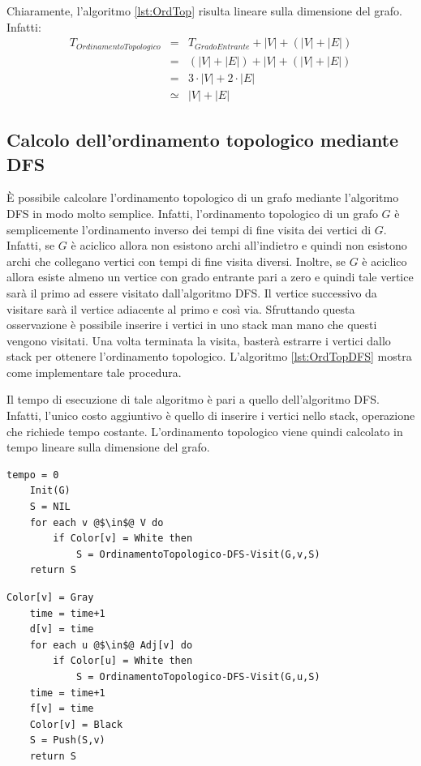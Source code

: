 Chiaramente, l'algoritmo \ref{lst:OrdTop} risulta lineare sulla dimensione del grafo. Infatti:
\begin{eqnarray*}
	T_{OrdinamentoTopologico} &=& T_{GradoEntrante} + |V| + (|V|+|E|)\\
	&=& (|V|+|E|) + |V| + (|V|+|E|) \\
	&=& 3 \cdot |V| + 2 \cdot |E| \\
	&\simeq& |V| + |E|
\end{eqnarray*}

\subsection{Calcolo dell'ordinamento topologico mediante DFS}
È possibile calcolare l'ordinamento topologico di un grafo mediante l'algoritmo \textsc{DFS} in modo molto semplice. Infatti, l'ordinamento topologico di un grafo $G$ è semplicemente l'ordinamento inverso dei tempi di fine visita dei vertici di $G$. Infatti, se $G$ è aciclico allora non esistono archi all'indietro e quindi non esistono archi che collegano vertici con tempi di fine visita diversi. Inoltre, se $G$ è aciclico allora esiste almeno un vertice con grado entrante pari a zero e quindi tale vertice sarà il primo ad essere visitato dall'algoritmo \textsc{DFS}. Il vertice successivo da visitare sarà il vertice adiacente al primo e così via. Sfruttando questa osservazione è possibile inserire i vertici in uno stack man mano che questi vengono visitati. Una volta terminata la visita, basterà estrarre i vertici dallo stack per ottenere l'ordinamento topologico. L'algoritmo \ref{lst:OrdTopDFS} mostra come implementare tale procedura.

Il tempo di esecuzione di tale algoritmo è pari a quello dell'algoritmo \textsc{DFS}. Infatti, l'unico costo aggiuntivo è quello di inserire i vertici nello stack, operazione che richiede tempo costante. L'ordinamento topologico viene quindi calcolato in tempo lineare sulla dimensione del grafo.
	\begin{lstlisting}[language=asd,caption={\textsc{OrdinamentoTopologico-DFS}(G)},label=lst:OrdTopDFS]
	tempo = 0
	Init(G)
	S = NIL
	for each v @$\in$@ V do
		if Color[v] = White then
			S = OrdinamentoTopologico-DFS-Visit(G,v,S)
	return S
\end{lstlisting}



	\begin{lstlisting}[language=asd,caption={\textsc{OrdinamentoTopologico-DFS-Visit}(G,v,S)},label=lst:OrdTopDFSVisit]
	Color[v] = Gray
	time = time+1
	d[v] = time
	for each u @$\in$@ Adj[v] do
		if Color[u] = White then
			S = OrdinamentoTopologico-DFS-Visit(G,u,S)
	time = time+1
	f[v] = time
	Color[v] = Black
	S = Push(S,v)
	return S
\end{lstlisting}



